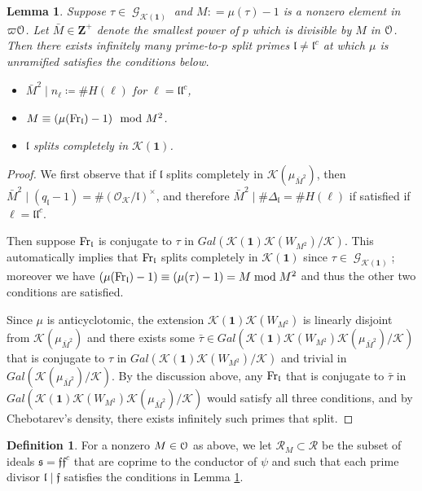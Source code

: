 \documentclass[leqno]{amsart}
\newtheorem{lem}[thm]{Lemma}
\theoremstyle{definition}
\newtheorem{defn}[thm]{Definition}
\theoremstyle{remark}
\newcommand{\id}{\mathbf{1}}
\newcommand{\oo}{\mathcal{O}}
\newcommand{\eo}{\EuScript{O}}
\newcommand{\Z}{{\mathbf{Z}}}
\DeclareMathOperator{\Gal}{\mathcal{G}}
\newcommand{\Fr}{\textnormal{Fr}} %
\newcommand{\ff}{\mathfrak{f}}
\newcommand{\fl}{\mathfrak{l}}
\newcommand{\fs}{\mathfrak{s}}
\newcommand{\K}{{\mathcal{K}}} %
\begin{document}
\begin{lem}\label{lem:estimate}
Suppose $\tau\in \Gal_{\K(\id)}$ and
$M\colon=\mu(\tau)-1$ is a nonzero element in $\varpi\eo$.
Let $\bar{M}\in\Z^+$
denote the smallest power of $p$
which is divisible by $M$ in $\eo$.
Then there exists infinitely many 
prime-to-$p$ split primes $\fl\neq\fl^c$
at which $\mu$ is unramified satisfies the conditions below.
\begin{itemize}
\item $\bar{M}^2\mid n_\ell\coloneqq \#H(\ell)$ for $\ell=\fl\fl^c$,
\item $M\equiv (\mu(\Fr_\fl)-1)\mod M^2$.
\item $\fl$ splits completely in $\K(\id)$.
\end{itemize}
\end{lem}
\begin{proof}

We first observe that if $\fl$ splits completely in 
$\K(\mu_{\bar{M}^2})$, then
$\bar{M}^2\mid (q_\fl-1)=\#(\oo_\K/\fl)^\times$,
and therefore $\bar{M}^2\mid \#\Delta_\fl=\#H(\ell)$
if satisfied if $\ell=\fl\fl^c$.

Then suppose $\Fr_\fl$ is conjugate to $\tau$
in $Gal(\K(\id)\K(W_{M^2})/\K)$.
This automatically implies that $\Fr_\fl$ splits completely 
in $\K(\id)$ since $\tau\in\Gal_{\K(\id)}$;
moreover we have
$(\mu(\Fr_\fl)-1)\equiv (\mu(\tau)-1)=M\bmod M^2$
and thus the other two conditions are satisfied.

Since $\mu$ is anticyclotomic,
the extension $\K(\id)\K(W_{M^2})$
is linearly disjoint from 
$\K(\mu_{\bar{M}^2})$
and there exists some $\bar{\tau}\in 
Gal(\K(\id)\K(W_{M^2})\K(\mu_{\bar{M}^2})/\K)$
that is conjugate to $\tau$ in 
$Gal(\K(\id)\K(W_{M^2})/\K)$
and trivial in 
$Gal(\K(\mu_{\bar{M}^2})/\K)$.
By the discussion above, any $\Fr_\fl$ 
that is conjugate to $\bar{\tau}$ in
$Gal(\K(\id)\K(W_{M^2})\K(\mu_{\bar{M}^2})/\K)$
would satisfy all three conditions,
and by Chebotarev's density,
there exists infinitely such primes that split.
    
\end{proof}

\begin{defn}\label{def:RM}
For a nonzero $M\in \eo$ as above,
we let $\mathcal{R}_M\subset \mathcal{R}$
be the subset of ideals $\fs=\ff\ff^c$
that are coprime to the conductor of $\psi$
and such that each prime divisor $\fl\mid \ff$
satisfies the conditions in Lemma \ref{lem:estimate}.
\end{defn}
\end{document}
